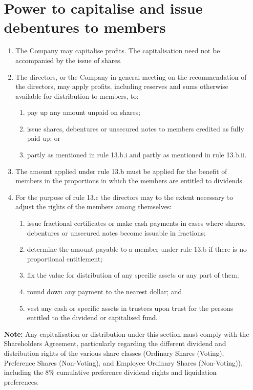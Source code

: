 \section{Power to capitalise and issue debentures to members}

\begin{enumerate}[label=(\alph*)]
    \item The Company may capitalise profits. The capitalisation need not be accompanied by the issue of shares.
    
    \item The directors, or the Company in general meeting on the recommendation of the directors, may apply profits, including reserves and sums otherwise available for distribution to members, to:
    \begin{enumerate}[label=(\roman*)]
        \item pay up any amount unpaid on shares;
        \item issue shares, debentures or unsecured notes to members credited as fully paid up; or
        \item partly as mentioned in rule 13.b.i and partly as mentioned in rule 13.b.ii.
    \end{enumerate}
    
    \item The amount applied under rule 13.b must be applied for the benefit of members in the proportions in which the members are entitled to dividends.
    
    \item For the purpose of rule 13.c the directors may to the extent necessary to adjust the rights of the members among themselves:
    \begin{enumerate}[label=(\roman*)]
        \item issue fractional certificates or make cash payments in cases where shares, debentures or unsecured notes become issuable in fractions;
        \item determine the amount payable to a member under rule 13.b if there is no proportional entitlement;
        \item fix the value for distribution of any specific assets or any part of them;
        \item round down any payment to the nearest dollar; and
        \item vest any cash or specific assets in trustees upon trust for the persons entitled to the dividend or capitalised fund.
    \end{enumerate}
\end{enumerate}

\textbf{Note:} Any capitalisation or distribution under this section must comply with the Shareholders Agreement, particularly regarding the different dividend and distribution rights of the various share classes (Ordinary Shares (Voting), Preference Shares (Non-Voting), and Employee Ordinary Shares (Non-Voting)), including the 8\% cumulative preference dividend rights and liquidation preferences. 